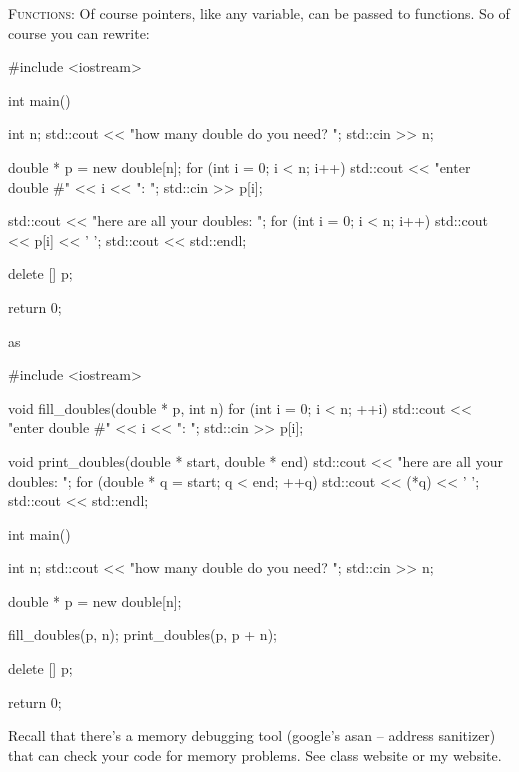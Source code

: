 \textsc{Functions:}
Of course pointers, like any variable, can be passed to functions.
So of course you can rewrite:
\begin{console}[frame=single,fontsize=\footnotesize]
#include <iostream>

int main()
{
    int n;
    std::cout << "how many double do you need? ";
    std::cin >> n;

    double * p = new double[n];
    for (int i = 0; i < n; i++)
    {
        std::cout << "enter double #" << i << ": ";
        std::cin >> p[i];
    }

    std::cout << "here are all your doubles: ";
    for (int i = 0; i < n; i++)
    {
        std::cout << p[i] << ' ';
    }
    std::cout << std::endl;

    delete [] p;

    return 0;
}
\end{console}
as
\begin{console}[frame=single,fontsize=\footnotesize]
#include <iostream>

void fill_doubles(double * p, int n)
{
    for (int i = 0; i < n; ++i)
    {
        std::cout << "enter double #" << i << ": ";
        std::cin >> p[i];
    }
}

void print_doubles(double * start, double * end)
{
    std::cout << "here are all your doubles: ";
    for (double * q = start; q < end; ++q)
    {
        std::cout << (*q) << ' ';
    }
    std::cout << std::endl;
}

int main()
{
    int n;
    std::cout << "how many double do you need? ";
    std::cin >> n;

    double * p = new double[n];

    fill_doubles(p, n);
    print_doubles(p, p + n);

    delete [] p;

    return 0;
}
\end{console}

Recall that there's a memory debugging tool (google's asan -- address sanitizer)
that can check your code for memory problems.
See class website or my website.
